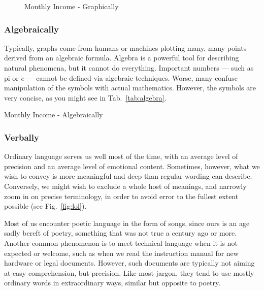 \begin{figure}[h]
\centering
{}
\caption[Graph]{Monthly Income  - Graphically\label{fig:graphically}}
\end{figure}


\subsubsection{Algebraically}
Typically, graphs come from humans or machines plotting many, 
many points derived from an \gls{algebraic} formula.
Algebra is a powerful tool for describing natural phenomena, 
but it cannot do everything.  Important numbers
--- such as \gls{pi} or $e$ --- cannot be defined via algebraic techniques.  
Worse, many confuse manipulation of the symbols with actual mathematics.
However, the symbols are very concise, as you might see in Tab.~\ref{tab:algebra}.

{Monthly Income - Algebraically\label{tab:algebra}}



\subsubsection{Verbally}
Ordinary language serves us well most of the time, with an average level of 
precision and an average level of
emotional content.  Sometimes, however, what we wish to convey is more 
meaningful and deep than
regular wording can describe.  Conversely, we might wish to exclude a whole 
host of meanings, and narrowly
zoom in on precise terminology, in order to avoid error to the fullest extent possible
(see Fig.~\ref{fig:lol}).


Most of us encounter poetic language in the form of songs, since ours is an 
age sadly bereft of
poetry, something that was not true a century ago or more.  Another common 
phenomenon is to meet 
technical language when it is not expected or welcome, such as when we read the 
instruction manual for new
hardware or legal documents.  However, such documents are typically not aiming at 
easy comprehension, but
precision.  Like most jargon, they tend to use mostly ordinary words in extraordinary 
ways, similar but opposite
to poetry.

